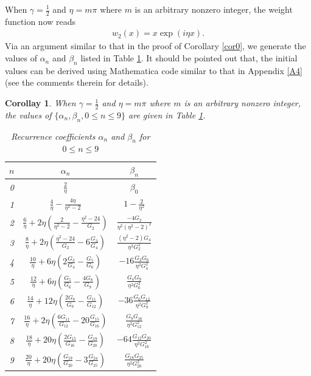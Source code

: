 \documentclass[11pt,a4paper]{article}
\newtheorem{corollary}[theorem]{Corollay}
\numberwithin{equation}{section}
\begin{document}
When $\gamma=\frac{1}{2}$ and $\eta=m\pi$ where $m$ is an arbitrary nonzero integer, the weight function now reads
\begin{align}
w_2(x)=x\exp(\mathit{i}\eta x).
\end{align}	
Via an argument similar to that in the proof of Corollary \ref{cor0}, we generate the values of $\alpha_n$ and $\beta_n$ listed in Table \ref{tab2:rec-coeffs}. It should be pointed out that, the initial values can be derived using Mathematica code similar to that in Appendix \ref{A4} (see the comments therein for details).
\begin{corollary}
When $\gamma=\frac{1}{2}$ and $\eta=m\pi$ where $m$ is an arbitrary nonzero integer, the values of $\{\alpha_{n},\beta_n, 0\leq n\leq 9\}$ are given in Table \ref{tab2:rec-coeffs}.	
		\begin{table}[H]
			\centering
			 \renewcommand{\arraystretch}{1.5}
			 \setlength{\tabcolsep}{3pt}
			\caption{Recurrence coefficients $\alpha_{n}$ and $\beta_{n}$ for $0\leq n \le 9$}
			\label{tab2:rec-coeffs}
			 \begin{tabular}{|c|c|c|}
\hline
$n$ & $\alpha_n$ & $\beta_n$   \\
\hline
0 & $\frac{2}{\eta}$ & $\beta_0$  \\
\hline
1 & $\frac{4}{\eta}-\frac{4\eta}{\eta^2-2}$ & $1-\frac{2}{\eta^2}$ \\
\hline
2&$\frac{6}{\eta}+2\eta\left(\frac{2}{\eta^2-2}-\frac{\eta^2-24}{G_2}\right)$ & $\frac{-4G_2}{\eta^2(\eta^2-2)^2}$ \\
\hline
3&$\frac{8}{\eta}+2\eta\left(\frac{\eta^2-24}{G_2}-6\frac{G_3}{G_4}\right)$&$\frac{(\eta^2-2)G_4}{\eta^2G_2^2}$ \\
\hline	
4&$\frac{10}{\eta}+6\eta\left(2\frac{G_3}{G_4}-\frac{G_5}{G_6}\right)$ & $-16\frac{G_2G_6}{\eta^2G_4^2}$ \\
\hline
5&$\frac{12}{\eta}+6\eta\left(\frac{G_5}{G_6}-\frac{4G_8}{G_9}\right)$ & $\frac{G_4G_9}{\eta^2G_6^2}$ \\
\hline
6&$\frac{14}{\eta}+12\eta\left(\frac{2G_8}{G_9}-\frac{G_{11}}{G_{12}}\right)$ & $-36\frac{G_6G_{12}}{\eta^2G_9^2}$ \\
\hline
7&$\frac{16}{\eta}+2\eta\left(\frac{6G_{11}}{G_{12}}-20\frac{G_{15}}{G_{16}}\right)$ & $\frac{G_9G_{16}}{\eta^2G_{12}^2}$ \\\hline
8&$\frac{18}{\eta}+20\eta\left(\frac{2G_{15}}{G_{16}}-\frac{G_{19}}{G_{20}}\right)$&$-64\frac{G_{12}G_{20}}{\eta^2G_{16}^2}$\\
\hline
9&$\frac{20}{\eta}+20\eta\left(\frac{G_{19}}{G_{20}}-3\frac{G_{24}}{G_{25}}\right)$&$\frac{G_{16}G_{25}}{\eta^2G_{20}^2}$\\

\end{tabular}
\end{table}
\end{corollary}
\end{document}
